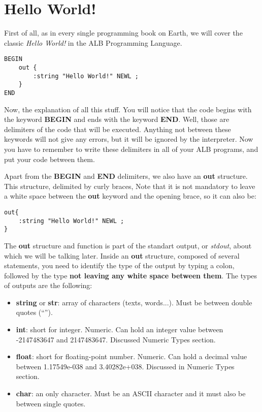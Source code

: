 \documentclass[12pt]{book}
\begin{document}
\section{Hello World!}

First of all, as in every single programming book on Earth, we will cover the classic \textit{Hello World!} in the ALB Programming Language.\bigskip
\begin{lstlisting}
BEGIN
	out {
		:string "Hello World!" NEWL ;
	}
END
\end{lstlisting}
\bigskip
Now, the explanation of all this stuff. You will notice that the code begins with the keyword \textbf{BEGIN} and ends with the keyword \textbf{END}. Well, those are delimiters of the code that will be executed. Anything not between these keywords will not give any errors, but it will be ignored by the interpreter. Now you have to remember to write these delimiters in all of your ALB programs, and put your code between them.\\
\bigskip

Apart from the \textbf{BEGIN} and \textbf{END} delimiters, we also have an \textbf{out} structure. This structure, delimited by curly braces, Note that it is not mandatory to leave a white space between the \textbf{out} keyword and the opening brace, so it can also be:
\bigskip
\begin{lstlisting}
out{
	:string "Hello World!" NEWL ;
}
\end{lstlisting}
\bigskip
The \textbf{out} structure and function is part of the standart output, or \textit{stdout}, about which we will be talking later. Inside an \textbf{out} structure, composed of several statements, you need to identify the type of the output by typing a colon, followed by the type \textbf{not leaving any white space between them}. The types of outputs are the following:
\begin{itemize}
	\item \textbf{string} or \textbf{str}: array of characters (texts, words...). Must be between double quotes (``'').
	\item \textbf{int}: short for integer. Numeric. Can hold an integer value between -2147483647 and 2147483647. Discussed Numeric Types section.
	\item \textbf{float}: short for floating-point number. Numeric. Can hold a decimal value between 1.17549e-038 and 3.40282e+038. Discussed in Numeric Types section.
	\item \textbf{char}: an only character. Must be an ASCII character and it must also be between single quotes.
\end{itemize}
\end{document}
